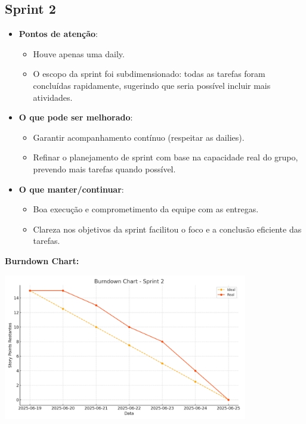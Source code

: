 \subsection{Sprint 2}

\begin{itemize}
  \item \textbf{Pontos de atenção}:
  \begin{itemize}
    \item Houve apenas uma daily.
    \item O escopo da sprint foi subdimensionado: todas as tarefas foram concluídas rapidamente, sugerindo que seria possível incluir mais atividades.
  \end{itemize}

  \item \textbf{O que pode ser melhorado}:
  \begin{itemize}
    \item Garantir acompanhamento contínuo (respeitar as dailies).
    \item Refinar o planejamento de sprint com base na capacidade real do grupo, prevendo mais tarefas quando possível.
  \end{itemize}

  \item \textbf{O que manter/continuar}:
  \begin{itemize}
    \item Boa execução e comprometimento da equipe com as entregas.
    \item Clareza nos objetivos da sprint facilitou o foco e a conclusão eficiente das tarefas.
  \end{itemize}
\end{itemize}

\vspace{1em}
\noindent\textbf{Burndown Chart:}

\begin{center}
  \includegraphics[width=0.8\textwidth]{pictures/burndown_sprint2.png}
\end{center}
